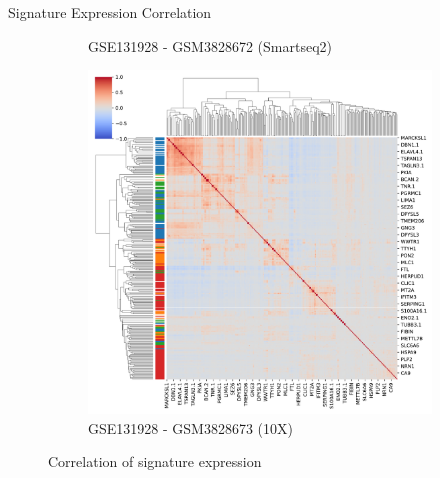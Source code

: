 \documentclass[aspectratio=169,9pt]{beamer}
\begin{document}
\begin{frame}{Signature Expression Correlation}
\begin{adjustwidth}{-5cm}{-5cm}
\begin{figure}
\begin{subfigure}[b]{0.38\textwidth}
                    \caption{GSE131928 - GSM3828672 (Smartseq2)}
                \end{subfigure}
                \begin{subfigure}[b]{0.38\textwidth}
                    \centering
                    \includegraphics[width=\textwidth]{GSM3828673_Corrplot_coloured}
                    \caption{GSE131928 - GSM3828673 (10X)}
                \end{subfigure}
                \caption{Correlation of signature expression}
            \end{figure}
        \end{adjustwidth}
    \end{frame}
\end{document}
